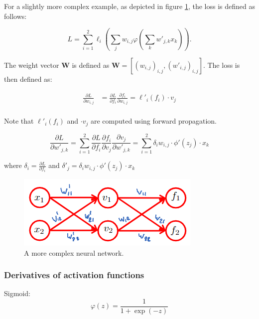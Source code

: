\documentclass[a4paper,10pt,twoside]{article}
\begin{document}
For a slightly more complex example, as depicted in figure \ref{aan-loss-more-complex-example}, the loss is defined as follows:

\begin{equation*}
    L = \sum_{i=1}^{2}\ell_i(\sum_{j}w_{i,j} \varphi(\sum_{k}w'_{j,k} x_k)).
\end{equation*}

The weight vector $\mathbf{W}$ is defined as $\mathbf{W} = [(w_{i,j})_{i,j},(w'_{i,j})_{i,j}]$. The loss is then defined as:

\begin{align*}
    \frac{\partial L}{\partial w_{i,j}}&=\frac{\partial L}{\partial f_{i}}\frac{\partial f_{i}}{\partial w_{i,j}}=\ell'_i(f_i)\cdot v_j\\
\end{align*}

Note that $\ell'_i(f_i)$ and $\cdot v_j$ are computed using forward propagation.

\begin{equation*}
    \frac{\partial L}{\partial w'_{j,k}}=\sum_{i=1}^{2}\frac{\partial L}{\partial f_{i}}\frac{\partial f_i}{\partial v_j}\frac{\partial v_j}{\partial w'_{j,k}}=\sum_{i=1}^{2}\delta_i w_{i,j}\cdot\phi'(z_j)\cdot x_k
\end{equation*}

where $\delta_i=\frac{\partial L}{\partial f_{i}}$ and $\delta '_j=\delta_i w_{i,j}\cdot\phi'(z_j)\cdot x_k$

\begin{figure}
    \centering
    \includegraphics[width=.5\textwidth]{figures/aan-loss-more-complex-example.png}
    \caption{A more complex neural network.}
    \label{aan-loss-more-complex-example}
\end{figure}

\subsubsection{Derivatives of activation functions}

Sigmoid: 
\begin{equation*}
    \varphi(z)=\frac{1}{1+\exp(-z)}
\end{equation*}
\end{document}
